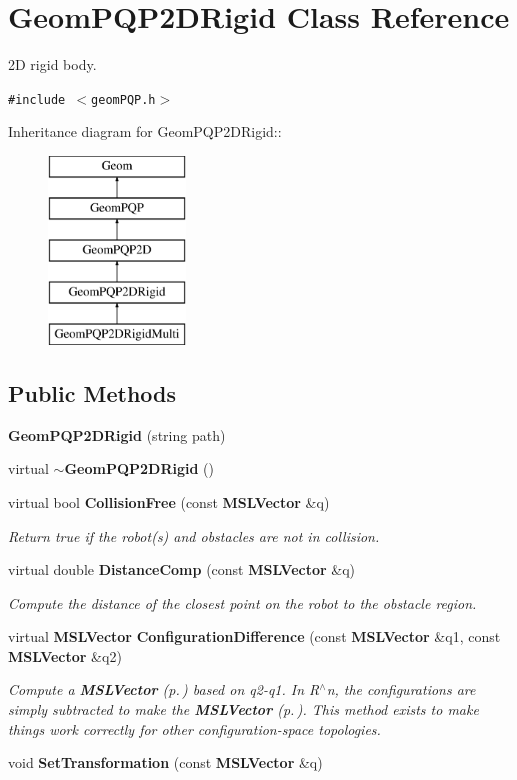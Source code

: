 \section{Geom\-PQP2DRigid  Class Reference}
\label{classGeomPQP2DRigid}
2D rigid body. 


{\tt \#include $<$geom\-PQP.h$>$}

Inheritance diagram for Geom\-PQP2DRigid::\begin{figure}[H]
\begin{center}
\leavevmode
\includegraphics[height=5cm]{classGeomPQP2DRigid}
\end{center}
\end{figure}
\subsection*{Public Methods}
\begin{CompactItemize}
\item 
{\bf Geom\-PQP2DRigid} (string path)
\item 
virtual {\bf $\sim$Geom\-PQP2DRigid} ()
\item 
virtual bool {\bf Collision\-Free} (const {\bf MSLVector} \&q)
\begin{CompactList}\small\item\em Return true if the robot(s) and obstacles are not in collision.\item\end{CompactList}\item 
virtual double {\bf Distance\-Comp} (const {\bf MSLVector} \&q)
\begin{CompactList}\small\item\em Compute the distance of the closest point on the robot to the obstacle region.\item\end{CompactList}\item 
virtual {\bf MSLVector} {\bf Configuration\-Difference} (const {\bf MSLVector} \&q1, const {\bf MSLVector} \&q2)
\begin{CompactList}\small\item\em Compute a {\bf MSLVector} {\rm (p.\,\pageref{classMSLVector})} based on q2-q1. In R$^\wedge$n, the configurations are simply subtracted to make the {\bf MSLVector} {\rm (p.\,\pageref{classMSLVector})}. This method exists to make things work correctly for other configuration-space topologies.\item\end{CompactList}\item 
void {\bf Set\-Transformation} (const {\bf MSLVector} \&q)
\end{CompactItemize}


